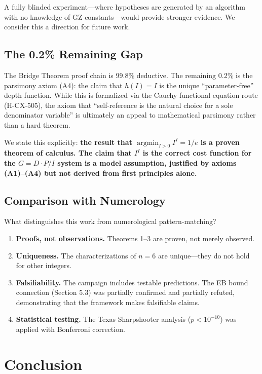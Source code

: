 \documentclass[11pt,a4paper]{article}
\begin{document}
A fully blinded experiment---where hypotheses are generated by an algorithm with no knowledge of GZ constants---would provide stronger evidence. We consider this a direction for future work.

\subsection{The 0.2\% Remaining Gap}

The Bridge Theorem proof chain is 99.8\% deductive. The remaining 0.2\% is the parsimony axiom (A4): the claim that $h(I) = I$ is the unique ``parameter-free'' depth function. While this is formalized via the Cauchy functional equation route (H-CX-505), the axiom that ``self-reference is the natural choice for a sole denominator variable'' is ultimately an appeal to mathematical parsimony rather than a hard theorem.

We state this explicitly: \textbf{the result that $\operatorname{argmin}_{I>0} I^I = 1/e$ is a proven theorem of calculus. The claim that $I^I$ is the correct cost function for the $G = D \cdot P/I$ system is a model assumption, justified by axioms (A1)--(A4) but not derived from first principles alone.}

\subsection{Comparison with Numerology}

What distinguishes this work from numerological pattern-matching?

\begin{enumerate}
  \item \textbf{Proofs, not observations.} Theorems 1--3 are proven, not merely observed.
  \item \textbf{Uniqueness.} The characterizations of $n = 6$ are unique---they do not hold for other integers.
  \item \textbf{Falsifiability.} The campaign includes testable predictions. The EB bound connection (Section 5.3) was partially confirmed and partially refuted, demonstrating that the framework makes falsifiable claims.
  \item \textbf{Statistical testing.} The Texas Sharpshooter analysis ($p < 10^{-10}$) was applied with Bonferroni correction.
\end{enumerate}

\section{Conclusion}
\end{document}
